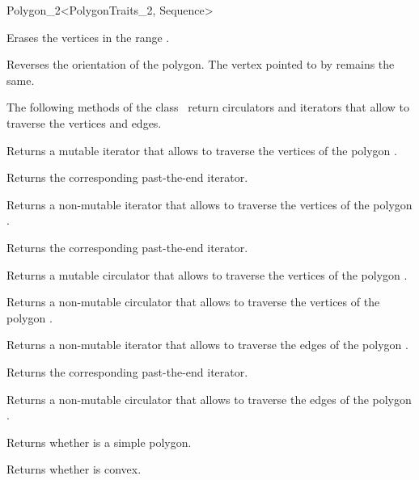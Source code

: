 \begin{ccRefClass}{Polygon_2<PolygonTraits_2, Sequence>}
{{  
    { Erases the vertices in the range \ccStyle{[first, last)}.}

    { Reverses the orientation of the polygon. The vertex pointed to by
       remains the same. }

The following methods of the class \ccClassName\ return
circulators and iterators that allow to traverse the vertices and edges.

    { Returns a mutable iterator that allows to traverse the vertices of
      the polygon .}

    { Returns the corresponding past-the-end iterator. }

    { Returns a non-mutable iterator that allows to traverse the vertices of
      the polygon .}

    { Returns the corresponding past-the-end iterator. }

    { Returns a mutable circulator that allows to traverse the vertices of
      the polygon .}

    { Returns a non-mutable circulator that allows to traverse the vertices of
      the polygon .}

    { Returns a non-mutable iterator that allows to traverse the edges of
      the polygon .}

    { Returns the corresponding past-the-end iterator. }

    { Returns a non-mutable circulator that allows to traverse the edges of
      the polygon .}


    { Returns whether  is a simple polygon.}

    { Returns whether  is convex. }

}}
\end{ccRefClass}
